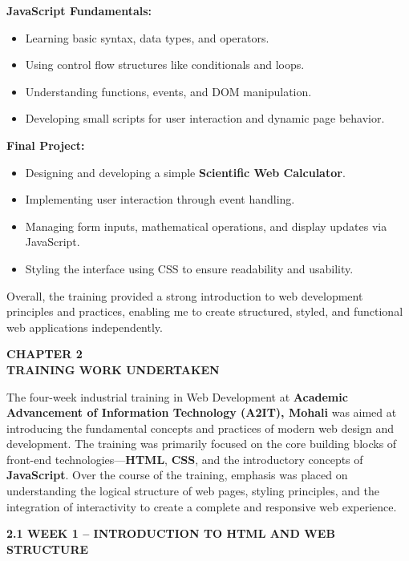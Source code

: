 \documentclass[a4paper,12pt,oneside]{report}
\numberwithin{equation}{chapter}
\numberwithin{figure}{chapter}
\numberwithin{table}{chapter}
\begin{document}
\textbf{JavaScript Fundamentals:}
\begin{itemize}
    \item Learning basic syntax, data types, and operators.
    \item Using control flow structures like conditionals and loops.
    \item Understanding functions, events, and DOM manipulation.
    \item Developing small scripts for user interaction and dynamic page behavior.
\end{itemize}

\textbf{Final Project:}
\begin{itemize}
    \item Designing and developing a simple \textbf{Scientific Web Calculator}.
    \item Implementing user interaction through event handling.
    \item Managing form inputs, mathematical operations, and display updates via JavaScript.
    \item Styling the interface using CSS to ensure readability and usability.
\end{itemize}

Overall, the training provided a strong introduction to web development principles and practices, enabling me to create structured, styled, and functional web applications independently.


\newpage
\begin{center}
    \Large\textbf{CHAPTER 2}\\[2mm]
    \large\textbf{TRAINING WORK UNDERTAKEN}
\end{center}

The four-week industrial training in Web Development at \textbf{Academic Advancement of Information Technology (A2IT), Mohali} was aimed at introducing the fundamental concepts and practices of modern web design and development. The training was primarily focused on the core building blocks of front-end technologies—\textbf{HTML}, \textbf{CSS}, and the introductory concepts of \textbf{JavaScript}. Over the course of the training, emphasis was placed on understanding the logical structure of web pages, styling principles, and the integration of interactivity to create a complete and responsive web experience.

\vspace{5mm}
\noindent
\textbf{2.1 WEEK 1 – INTRODUCTION TO HTML AND WEB STRUCTURE}
\end{document}

